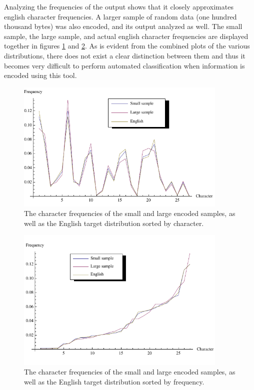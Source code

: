 \documentclass[12pt]{article}
\theoremstyle{remark}
\theoremstyle{definition}
\theoremstyle{definition}
\theoremstyle{definition}
\begin{document}
Analyzing the frequencies of the output shows that it closely approximates english character frequencies. A larger sample of random data (one hundred thousand bytes) was also encoded, and its output analyzed as well. The small sample, the large sample, and actual english character frequencies are displayed together in figures \ref{FIGURE_frequencies-bytop} and \ref{FIGURE_frequencies-bychar}. As is evident from the combined plots of the various distributions, there does not exist a clear distinction between them and thus it becomes very difficult to perform automated classification when information is encoded using this tool.

\begin{figure}
\centering
\includegraphics[width=0.9\textwidth]{figures/frequencies-bychar.pdf}
\caption[Plot of character frequencies by frequency]{The character frequencies of the small and large encoded samples, as well as the English target distribution sorted by character.}
\label{FIGURE_frequencies-bytop}
\end{figure}

\begin{figure}
\centering
\includegraphics[width=0.9\textwidth]{figures/frequencies-bytop.pdf}
\caption[Plot of character frequencies by character]{The character frequencies of the small and large encoded samples, as well as the English target distribution sorted by frequency.}
\label{FIGURE_frequencies-bychar}
\end{figure}
\end{document}
